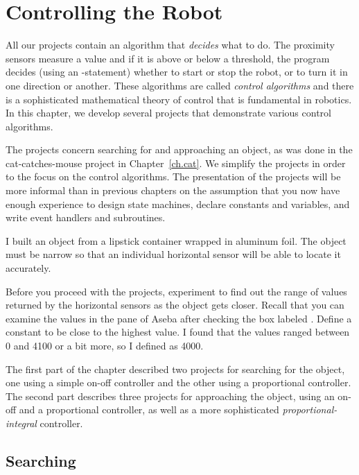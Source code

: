 
\chapter{Controlling the Robot}\label{ch.control}

All our projects contain an algorithm that \emph{decides} what to do.
The proximity sensors measure a value and if it is above or below a
threshold, the program decides (using an -statement) whether to
start or stop the robot, or to turn it in one direction or another. These
algorithms are called \emph{control algorithms} and there is a
sophisticated mathematical theory of control that is fundamental in
robotics. In this chapter, we develop several projects that demonstrate
various control algorithms.

The projects concern searching for and approaching an object, as was
done in the cat-catches-mouse project in Chapter~\ref{ch.cat}. We
simplify the projects in order to the focus on the control algorithms.
The presentation of the projects will be more informal than in
previous chapters on the assumption that you now have enough experience
to design state machines, declare constants and variables, and write
event handlers and subroutines.

I built an object from a lipstick container wrapped in aluminum foil.
The object must be narrow so that an individual horizontal sensor
will be able to locate it accurately.


Before you proceed with the projects, experiment to find out the range
of values returned by the horizontal sensors as the object
gets closer. Recall that you can examine the values in the
 pane of Aseba after checking the box labeled .
Define a constant  to be close to the highest value. I
found that the values ranged between 0 and 4100 or a bit more, so I
defined  as 4000.

The first part of the chapter described two projects for searching for
the object, one using a simple on-off controller and the other using a
proportional controller. The second part describes three projects for
approaching the object, using an on-off and a proportional controller,
as well as a more sophisticated \emph{proportional-integral} controller.

\section{Searching}

